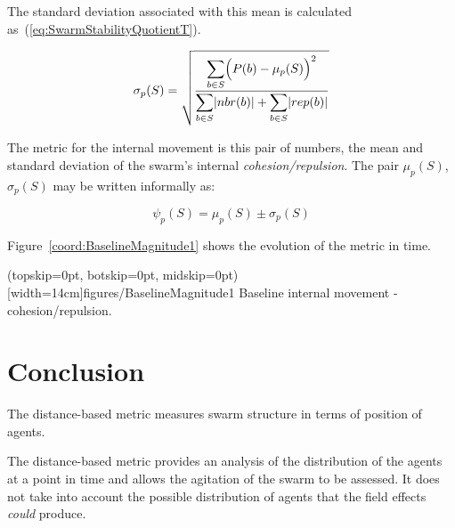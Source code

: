 \documentclass{ieeeaccess}
\begin{document}
The standard deviation associated with this mean is calculated as~(\ref{eq:SwarmStabilityQuotientT}).

\begin{equation}
\label{eq:SwarmStabilityQuotientT}
\sigma_p(S) = \sqrt{\frac{\mathlarger{\sum_{b \in S}}\Big(P(b)-\mu_p(S)\Big)^2}{\mathlarger{\sum_{b \in S}}|nbr(b)| + \mathlarger{\sum_{b \in S}}|rep(b)|}}
\end{equation}

The metric for the internal movement is this pair of numbers, the mean and standard deviation of the swarm's internal \emph{cohesion/repulsion}. The pair $\mu_p(S)$, $\sigma_p(S)$ may be written informally as: 

\begin{equation}
\label{eq:SwarmPotentialMagnitude}
\psi_p(S) = \mu_p(S)\pm \sigma_p(S)
\end{equation}

Figure~\ref{coord:BaselineMagnitude1} shows the evolution of the metric in time.

\Figure[t!](topskip=0pt, botskip=0pt, midskip=0pt)[width=14cm]{figures/BaselineMagnitude1}
{Baseline internal movement - cohesion/repulsion.\label{coord:BaselineMagnitude1}}


\section{Conclusion\label{metric:MagnitudeDistanceComparison}}
The distance-based metric measures swarm structure in terms of position of agents.

The distance-based metric provides an analysis of the distribution of the agents at a point in time and allows the agitation of the swarm to be assessed. It does not take into account the possible distribution of agents that the field effects \emph{could} produce.
\end{document}
